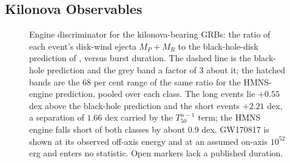 \documentclass[twocolumn,apj]{openjournal}
\begin{document}
\subsection{Kilonova Observables} \label{sec:kn}
\begin{figure}[!tbp]
\caption{Engine discriminator for the \citet{rastinejad2024} kilonova-bearing
GRBs: the ratio of each event's disk-wind ejecta $M_P + M_R$ to the
black-hole-disk prediction of \citet[Eq.~11]{gottlieb2024}, versus burst
duration. The dashed line is the black-hole prediction and the grey band a
factor of 3 about it; the hatched bands are the 68 per cent range of the same
ratio for the HMNS-engine prediction, pooled over each class. The long events
lie $+0.55$ dex above the black-hole prediction and the short events $+2.21$
dex, a separation of $1.66$ dex carried by the $T_{50}^{\alpha-1}$ term; the
HMNS engine falls short of both classes by about 0.9 dex. GW170817 is shown at
its observed off-axis energy and at an assumed on-axis $10^{52}$ erg and enters
no statistic. Open markers lack a published duration. \label{fig:engine}}
\end{figure}
\end{document}
